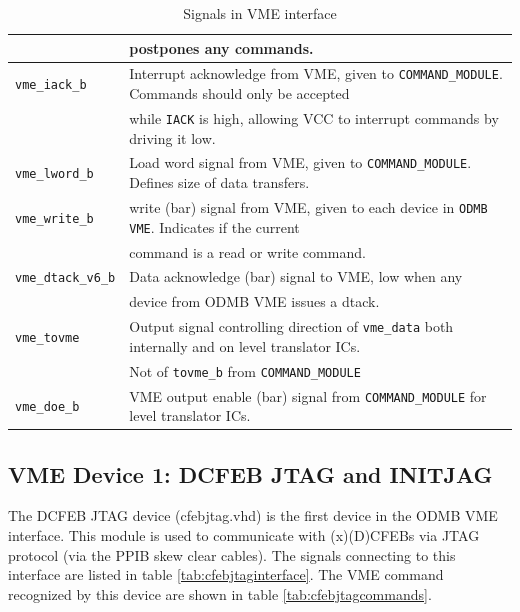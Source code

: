 \documentclass[10pt,a4paper]{article}
\begin{document}
\begin{table}[H]
\begin{tabular}{|l|l|}
                     & postpones any commands.\\ \hline
\texttt{vme\_iack\_b}& Interrupt acknowledge from VME, given to \texttt{COMMAND\_MODULE}. Commands should only be accepted \\
                     & while \texttt{IACK} is high, allowing VCC to interrupt commands by driving it low.\\ \hline
\texttt{vme\_lword\_b}& Load word signal from VME, given to \texttt{COMMAND\_MODULE}. Defines size of data transfers.\\ \hline
\texttt{vme\_write\_b}& write (bar) signal from VME, given to each device in \texttt{ODMB VME}. Indicates if the current \\
                      & command is a read or write command.\\ \hline
\texttt{vme\_dtack\_v6\_b}& Data acknowledge (bar) signal to VME, low when any \\
                 & device from ODMB VME issues a dtack.\\ \hline \hline
\texttt{vme\_tovme}& Output signal controlling direction of \texttt{vme\_data} both internally and on level translator ICs. \\
          & Not of \texttt{tovme\_b} from \texttt{COMMAND\_MODULE}\\ \hline
\texttt{vme\_doe\_b}& VME output enable (bar) signal from \texttt{COMMAND\_MODULE} for level translator ICs.\\ \hline
\end{tabular}
\caption{Signals in VME interface}
\label{tab:vmeinterface}
\end{table}

\subsection{VME Device 1: DCFEB JTAG and INITJAG}

The DCFEB JTAG device (cfebjtag.vhd) is the first device in the ODMB VME interface. This module is used to communicate with (x)(D)CFEBs via JTAG protocol (via the PPIB skew clear cables). The signals connecting to this interface are listed in table \ref{tab:cfebjtaginterface}. The VME command recognized by this device are shown in table \ref{tab:cfebjtagcommands}.
\end{document}
